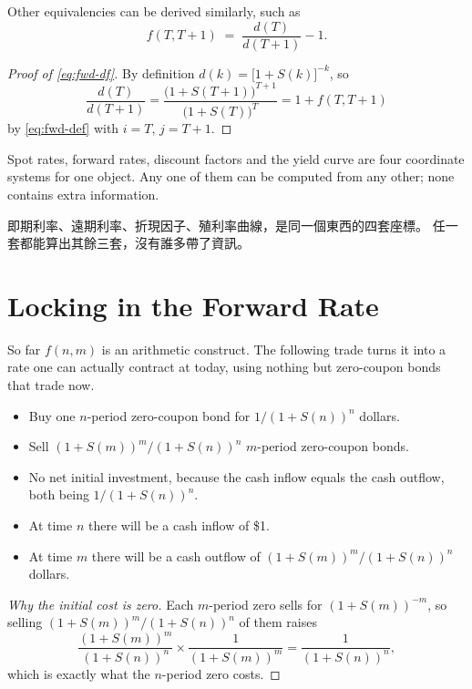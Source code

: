 Other equivalencies can be derived similarly, such as
\begin{equation}
	f(T,T+1) \;=\; \frac{d(T)}{d(T+1)} - 1 . \label{eq:fwd-df}
\end{equation}

\suppstart
\begin{proof}[Proof of \eqref{eq:fwd-df}]
	By definition $d(k)=\bigl[1+S(k)\bigr]^{-k}$, so
	\[
		\frac{d(T)}{d(T+1)} = \frac{\bigl(1+S(T+1)\bigr)^{T+1}}{\bigl(1+S(T)\bigr)^{T}} = 1+f(T,T+1)
	\]
	by \eqref{eq:fwd-def} with $i=T$, $j=T+1$.
\end{proof}

\begin{moral}
	Spot rates, forward rates, discount factors and the yield curve are four coordinate systems for one object.
	Any one of them can be computed from any other; none contains extra information.

	即期利率、遠期利率、折現因子、殖利率曲線，是同一個東西的四套座標。
	任一套都能算出其餘三套，沒有誰多帶了資訊。
\end{moral}
\suppend

\section{Locking in the Forward Rate}
\label{sec:lock-fwd}


So far $f(n,m)$ is an arithmetic construct.
The following trade turns it into a rate one can actually contract at today, using nothing but zero-coupon bonds that trade now.

\begin{itemize}[nosep]
	\item Buy one $n$-period zero-coupon bond for $1/(1+S(n))^{n}$ dollars.
	\item Sell $(1+S(m))^{m}/(1+S(n))^{n}$ $m$-period zero-coupon bonds.
	\item No net initial investment, because the cash inflow equals the cash outflow, both being $1/(1+S(n))^{n}$.
	\item At time $n$ there will be a cash inflow of \$1.
	\item At time $m$ there will be a cash outflow of $(1+S(m))^{m}/(1+S(n))^{n}$ dollars.
\end{itemize}

\suppstart
\begin{proof}[Why the initial cost is zero]
	Each $m$-period zero sells for $(1+S(m))^{-m}$, so selling $(1+S(m))^{m}/(1+S(n))^{n}$ of them raises
	\[
		\frac{(1+S(m))^{m}}{(1+S(n))^{n}}\times\frac{1}{(1+S(m))^{m}} = \frac{1}{(1+S(n))^{n}} ,
	\]
	which is exactly what the $n$-period zero costs.
\end{proof}

